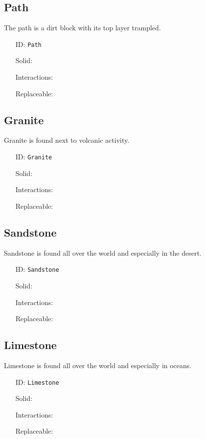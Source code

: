 \subsection{Path}\label{subsec:blocks_path}
The path is a dirt block with its top layer trampled.
\newline
\begin{itemize}[nosep]
    \item[ID:] \texttt{Path}
    \item[Solid:]  \Checkmark \item[Interactions:]  \XSolidBrush \item[Replaceable:]  \XSolidBrush
\end{itemize}

\subsection{Granite}\label{subsec:blocks_granite}
Granite is found next to volcanic activity.
\newline
\begin{itemize}[nosep]
    \item[ID:] \texttt{Granite}
    \item[Solid:]  \Checkmark \item[Interactions:]  \XSolidBrush \item[Replaceable:]  \XSolidBrush
\end{itemize}

\subsection{Sandstone}\label{subsec:blocks_sandstone}
Sandstone is found all over the world and especially in the desert.
\newline
\begin{itemize}[nosep]
    \item[ID:] \texttt{Sandstone}
    \item[Solid:]  \Checkmark \item[Interactions:]  \XSolidBrush \item[Replaceable:]  \XSolidBrush
\end{itemize}

\subsection{Limestone}\label{subsec:blocks_limestone}
Limestone is found all over the world and especially in oceans.
\newline
\begin{itemize}[nosep]
    \item[ID:] \texttt{Limestone}
    \item[Solid:]  \Checkmark \item[Interactions:]  \XSolidBrush \item[Replaceable:]  \XSolidBrush
\end{itemize}

